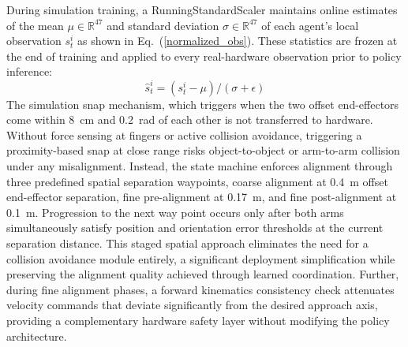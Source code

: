 \documentclass[lettersize,journal]{IEEEtran}
\begin{document}
During simulation training, a RunningStandardScaler maintains online estimates of the mean $\mu \in \mathbb{R}^{47}$ and standard deviation $\sigma \in \mathbb{R}^{47}$ of each agent's local observation $s_t^i$ as shown in Eq.~(\ref{normalized_obs}). These statistics are frozen at the end of training and applied to every real-hardware observation prior to policy inference:
\begin{equation}
    \hat{s}^{i}_{t} = (s^{i}_{t} - \mu)/(\sigma + \epsilon)
    \label{normalized_obs}
\end{equation}
The simulation snap mechanism, which triggers when the two offset end-effectors come within 8~cm and 0.2~rad of each other is not transferred to hardware. Without force sensing at fingers or active collision avoidance, triggering a proximity-based snap at close range risks object-to-object or arm-to-arm collision under any misalignment. Instead, the state machine enforces alignment through three predefined spatial separation waypoints, coarse alignment at 0.4~m offset end-effector separation, fine pre-alignment at 0.17~m, and fine post-alignment at 0.1~m. Progression to the next way point occurs only after both arms simultaneously satisfy position and orientation error thresholds at the current separation distance. This staged spatial approach eliminates the need for a collision avoidance module entirely, a significant deployment simplification while preserving the alignment quality achieved through learned coordination. Further, during fine alignment phases, a forward kinematics consistency check attenuates velocity commands that deviate significantly from the desired approach axis, providing a complementary hardware safety layer without modifying the policy architecture.
\end{document}
